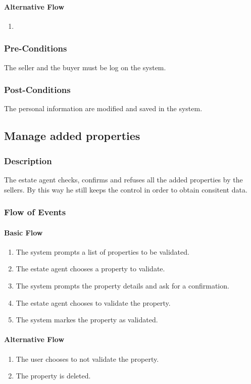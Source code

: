 \documentclass[a4paper,12pt]{article}
\begin{document}
\paragraph{Alternative Flow}
\begin{enumerate}
\item
\end{enumerate}
\subsubsection{Pre-Conditions}
The seller and the buyer must be log on the system.
\subsubsection{Post-Conditions}
The personal information are modified and saved in the system.

\subsection{Manage added properties}
\subsubsection{Description}
The estate agent checks, confirms and refuses all the added properties by the sellers. By this way he still keeps the control in order to obtain consitent data.
\subsubsection{Flow of Events}
\paragraph{Basic Flow}
\begin{enumerate}
\item The system prompts a list of properties to be validated.
\item The estate agent chooses a property to validate.
\item The system prompts the property details and ask for a confirmation.
\item The estate agent chooses to validate the property.
\item The system markes the property as validated.
\end{enumerate}
\paragraph{Alternative Flow}
\begin{enumerate}
\item The user chooses to not validate the property.
\item The property is deleted.
\end{enumerate}
\end{document}
